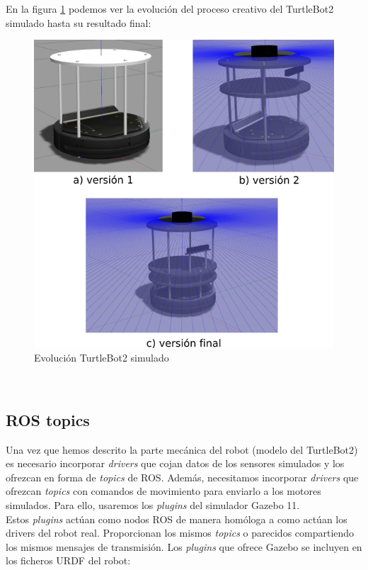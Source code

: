 En la figura \ref{fig:evolucion_turtlebot2_sim} podemos ver la evolución del proceso creativo del TurtleBot2 simulado hasta su resultado final:\\
\begin{figure} [H]
  \begin{center}
    \includegraphics[width=12.5cm]{imagenes/cap4/creacion-turtlebot2-sim.png}
  \end{center}
  \caption[Evolución TurtleBot2 simulado]{Evolución TurtleBot2 simulado}
  \label{fig:evolucion_turtlebot2_sim}
\end{figure}\


\subsection{ROS topics}
\label{subsec:ros_topics}

Una vez que hemos descrito la parte mecánica del robot (modelo del TurtleBot2) es necesario incorporar \textit{drivers} que cojan datos de los sensores simulados y los ofrezcan en forma de \textit{topics} de ROS. Además, necesitamos incorporar \textit{drivers} que ofrezcan \textit{topics} con comandos de movimiento para enviarlo a los motores simulados. Para ello, usaremos los \textit{plugins} del simulador Gazebo 11.\\

Estos \textit{plugins} actúan como nodos ROS de manera homóloga a como actúan los drivers del robot real. Proporcionan los mismos \textit{topics} o parecidos compartiendo los mismos mensajes de transmisión. Los \textit{plugins} que ofrece Gazebo se incluyen en los ficheros URDF del robot:\\

